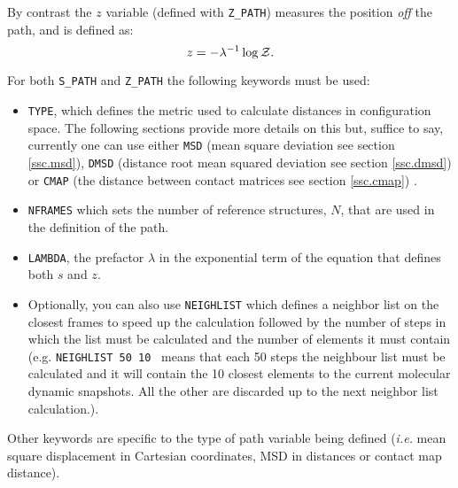 \documentclass[12pt,fleqn]{report}
\newcommand{\keyword}[1]{\index{Keywords!{\tt #1}} {\tt #1}}
\begin{document}
  
By contrast the $z$ variable (defined with {\tt Z\_PATH}) measures the position
{\it off} the path, and is defined as:
$$ z = - \lambda^{-1} \log {\cal Z}. $$

For both \keyword{S\_PATH} and \keyword{Z\_PATH} the following keywords must be used:
\begin{itemize}
\item {\tt TYPE}, which defines the metric used to calculate distances 
 in configuration space.  The following sections provide more details
 on this but, suffice to say, currently one can use either {\tt MSD} 
 (mean square deviation see section \ref{ssc.msd}), 
 {\tt DMSD} (distance root mean squared deviation see section \ref{ssc.dmsd}) 
 or {\tt CMAP} (the distance between contact matrices see section \ref{ssc.cmap}) \cite{Bo.Bra:08}. 
\item {\tt NFRAMES} which sets the  number of reference structures, $N$,
that are used in the definition of the path.
\item {\tt LAMBDA}, the prefactor $\lambda$ in the exponential 
  term of the equation that defines both $s$ and $z$. 
\item Optionally, you can also use {\tt NEIGHLIST} which defines a neighbor list on the closest 
      frames to speed up the calculation followed by the number of steps in which the list must be calculated
and the number of elements it must contain (e.g. {\tt NEIGHLIST 50 10 } means that each 50 steps the neighbour list must be calculated 
and it will contain the 10 closest elements to the current molecular dynamic snapshots. All the other are discarded up to the next neighbor list calculation.).
\end{itemize}
 
Other keywords are specific to the type of path variable being defined
(\emph{i.e.} mean square displacement in Cartesian coordinates, 
MSD in distances or contact map distance). 
\end{document}
